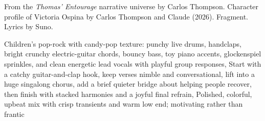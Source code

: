 
\begin{notes}
From the \emph{Thomas’ Entourage} narrative universe by Carlos Thompson. Character profile of Victoria Ospina by Carlos Thompson and Claude (2026). Fragment. Lyrics by Suno.
\end{notes}
\begin{style}
Children’s pop-rock with candy-pop texture: punchy live drums, handclaps, bright crunchy electric-guitar chords, bouncy bass, toy piano accents, glockenspiel sprinkles, and clean energetic lead vocals with playful group responses, Start with a catchy guitar-and-clap hook, keep verses nimble and conversational, lift into a huge singalong chorus, add a brief quieter bridge about helping people recover, then finish with stacked harmonies and a joyful final refrain, Polished, colorful, upbeat mix with crisp transients and warm low end; motivating rather than frantic
\end{style}
